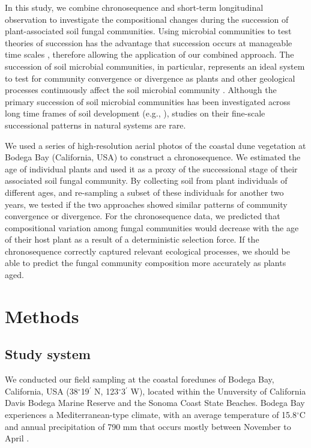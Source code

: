 In this study, we combine chronosequence and short-term longitudinal observation to investigate the compositional changes during the succession of plant-associated soil fungal communities.
Using microbial communities to test theories of succession has the advantage that succession occurs at manageable time scales \citep{Fierer2010, Chaparro2013, Gao2019}, therefore allowing the application of our combined approach.
The succession of soil microbial communities, in particular, represents an ideal system to test for community convergence or divergence as plants and other geological processes continuously affect the soil microbial community \citep{BrownJumpponen2014, Castle2016, Dinnage2019}. Although the primary succession of soil microbial communities has been investigated across long time frames of soil development (e.g., \citealp{BrownJumpponen2014, Castle2016}), studies on their fine-scale successional patterns in natural systems are rare. 
\par


We used a series of high-resolution aerial photos of the coastal dune vegetation at Bodega Bay (California, USA) to construct a chronosequence.
We estimated the age of individual plants and used it as a proxy of the successional stage of their associated soil fungal community. By collecting soil from plant individuals of different ages, and re-sampling a subset of these individuals for another two years, we tested if the two approaches showed similar patterns of community convergence or divergence. For the chronosequence data, we predicted that compositional variation among fungal communities would decrease with the age of their host plant as a result of a deterministic selection force. If the chronosequence correctly captured relevant ecological processes, we should be able to predict the fungal community composition more accurately as plants aged. 
\par



\section{Methods}
\subsection*{Study system}
We conducted our field sampling at the coastal foredunes of Bodega Bay, California, USA (38$^{\circ}$19$^\prime$ N, 123$^{\circ}$3$^\prime$ W), located within the Unuversity of California Davis Bodega Marine Reserve and the Sonoma Coast State Beaches. Bodega Bay experiences a Mediterranean-type climate, with an average temperature of 15.8$^{\circ}$C and annual precipitation of 790 mm that occurs mostly between November to April \citep{Conser2009}. 
\par


